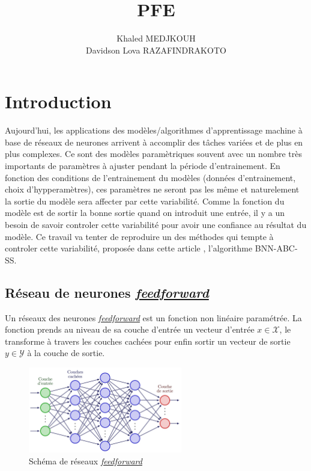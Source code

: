 \documentclass[french,12pt]{article}
\title{PFE}
\author{Khaled MEDJKOUH \\ Davidson Lova RAZAFINDRAKOTO}
\begin{document}
\maketitle

\pagebreak

\tableofcontents

\pagebreak

\section{Introduction}

Aujourd'hui, les applications des modèles/algorithmes d'apprentissage machine à base
de réseaux de neurones arrivent à accomplir des tâches variées et de plus 
en plus complexes. Ce sont des modèles paramètriques souvent avec un nombre très 
importants de paramètres à ajuster pendant la période d'entrainement. En fonction des
conditions de l'entrainement du modèles (données d'entrainement, choix d'hypperamètres),
ces paramètres ne seront pas les même et naturelement la sortie du modèle
sera affecter par cette variabilité. Comme la fonction du modèle est de sortir la bonne
sortie quand on introduit une entrée, il y a un besoin de savoir controler cette variabilité
pour avoir une confiance au résultat du modèle. Ce travail va tenter de reproduire un 
des méthodes qui tempte à controler cette variabilité, proposée dans cette article \cite{Fernndez2022}, 
l'algorithme BNN-ABC-SS.


\subsection{Réseau de neurones \href{https://en.wikipedia.org/wiki/Feedforward_neural_network}{\textit{feedforward}}}

Un réseaux des neurones \href{https://en.wikipedia.org/wiki/Feedforward_neural_network}{\textit{feedforward}} est un fonction non linéaire paramétrée. La fonction 
prends au niveau de sa couche d'entrée un vecteur d'entrée $x \in \mathcal{X}$, le transforme 
à travers les couches cachées pour enfin sortir un vecteur de sortie $y \in \mathcal{Y}$ à la couche de sortie.

\begin{figure}[H]
    \centerline{\includegraphics[width = 0.6\textwidth]{FNN/Images/fnn/fnn_page-0001.jpg}}
    \caption{Schéma de réseaux \href{https://en.wikipedia.org/wiki/Feedforward_neural_network}{\textit{feedforward}} \cite{NeetGraph}}
    \label{fig:fnn}
\end{figure}
\end{document}
